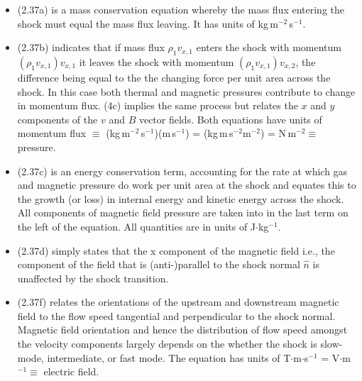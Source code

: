 \begin{itemize}
\item (2.37a) is a mass conservation equation whereby the mass flux entering the shock must equal the mass flux leaving. It has units of kg\,m$^{-2}$\,s$^{-1}$.
\item (2.37b) indicates that if mass flux $\rho_{1} v_{x,1}$ enters the shock with momentum $(\rho_{1} v_{x,1})v_{x,1}$ it leaves the shock with momentum $(\rho_{1} v_{x,1})v_{x,2}$, the difference being equal to the the changing force per unit area across the shock. In this case both thermal and magnetic pressures contribute to change in momentum flux. (4c) implies the same process but relates the $x$ and $y$ components of the $v$ and $B$ vector fields. Both equations have units of momentum flux $\equiv$ (kg\,m$^{-2}$\,s$^{-1}$)(m\,s$^{-1}$) = (kg\,m\,s$^{-2}$m$^{-2}$) = N\,m$^{-2}\equiv$ pressure.
\item (2.37c) is an energy conservation term, accounting for the rate at which gas and magnetic pressure do work per unit area at the shock and equates this to the growth (or loss) in internal energy and kinetic energy across the shock. All components of magnetic field pressure are taken into in the last term on the left of the equation. All quantities are in units of J$\cdot$kg$^{-1}$.
\item (2.37d) simply states that the x component of the magnetic field i.e., the component of the field that is (anti-)parallel to the shock normal $\hat{n}$ is unaffected by the shock transition. 
\item (2.37f) relates the orientations of the upstream and downstream magnetic field to the flow speed tangential and perpendicular to the shock normal. Magnetic field orientation and hence the distribution of flow speed amongst the velocity components largely depends on the whether the shock is slow-mode, intermediate, or fast mode. The equation has units of T$\cdot$m$\cdot$s$^{-1}$ = V$\cdot$m$^{-1}\equiv$ electric field.
\end{itemize}

